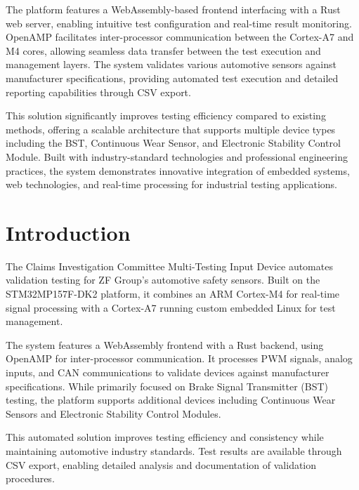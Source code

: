 \documentclass[12pt]{article}
\begin{document}
The platform features a WebAssembly-based frontend interfacing with a Rust web 
server, enabling intuitive test configuration and real-time result monitoring. 
OpenAMP facilitates inter-processor communication between the Cortex-A7 and M4 
cores, allowing seamless data transfer between the test execution and management 
layers. The system validates various automotive sensors against manufacturer 
specifications, providing automated test execution and detailed reporting 
capabilities through CSV export.

This solution significantly improves testing efficiency compared to existing methods, 
offering a scalable architecture that supports multiple device types including the 
BST, Continuous Wear Sensor, and Electronic Stability Control Module. Built with 
industry-standard technologies and professional engineering practices, the system 
demonstrates innovative integration of embedded systems, web technologies, and 
real-time processing for industrial testing applications.

\section{Introduction}
The Claims Investigation Committee Multi-Testing Input Device automates validation 
testing for ZF Group's automotive safety sensors. Built on the STM32MP157F-DK2 
platform, it combines an ARM Cortex-M4 for real-time signal processing with a 
Cortex-A7 running custom embedded Linux for test management.

The system features a WebAssembly frontend with a Rust backend, using OpenAMP for 
inter-processor communication. It processes PWM signals, analog inputs, and CAN 
communications to validate devices against manufacturer specifications. While 
primarily focused on Brake Signal Transmitter (BST) testing, the platform supports 
additional devices including Continuous Wear Sensors and Electronic Stability 
Control Modules.

This automated solution improves testing efficiency and consistency while 
maintaining automotive industry standards. Test results are available through CSV 
export, enabling detailed analysis and documentation of validation procedures.

\end{document}
